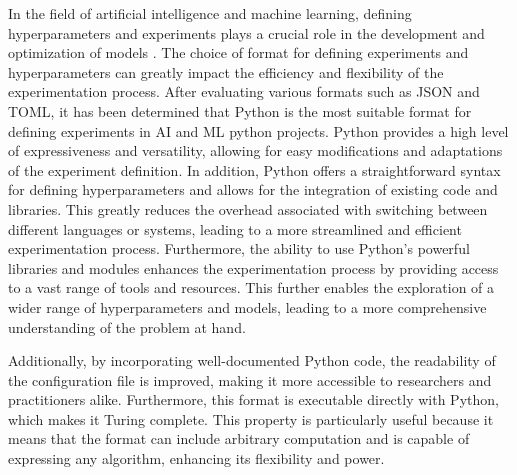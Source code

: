 In the field of artificial intelligence and machine learning, defining hyperparameters and experiments plays a crucial role in the development and optimization of models \cite{wu2019hyperparameter}. The choice of format for defining experiments and hyperparameters can greatly impact the efficiency and flexibility of the experimentation process. After evaluating various formats such as JSON and TOML, it has been determined that Python is the most suitable format for defining experiments in AI and ML python projects. Python provides a high level of expressiveness and versatility, allowing for easy modifications and adaptations of the experiment definition. In addition, Python offers a straightforward syntax for defining hyperparameters and allows for the integration of existing code and libraries. This greatly reduces the overhead associated with switching between different languages or systems, leading to a more streamlined and efficient experimentation process. Furthermore, the ability to use Python's powerful libraries and modules enhances the experimentation process by providing access to a vast range of tools and resources. This further enables the exploration of a wider range of hyperparameters and models, leading to a more comprehensive understanding of the problem at hand.

Additionally, by incorporating well-documented Python code, the readability of the configuration file is improved, making it more accessible to researchers and practitioners alike. Furthermore, this format is executable directly with Python, which makes it Turing complete. This property is particularly useful because it means that the format can include arbitrary computation and is capable of expressing any algorithm, enhancing its flexibility and power.




